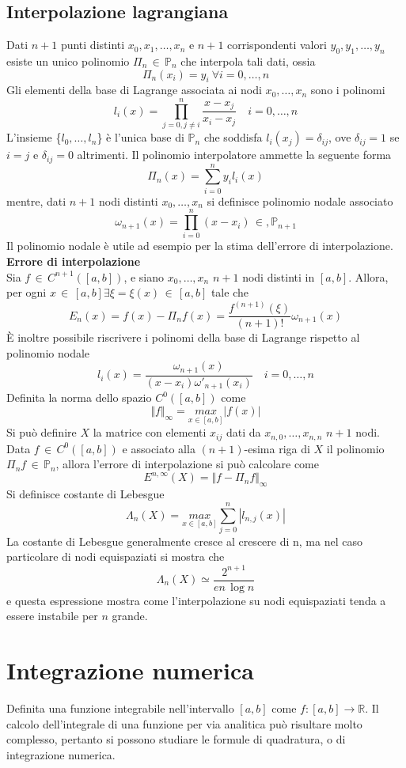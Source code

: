 \documentclass[a4paper,12pt]{article}
\begin{document}
\subsection{Interpolazione lagrangiana}
Dati $n + 1$ punti distinti $x_0 , x_1 , \ldots, x_n$ e $n + 1$  corrispondenti valori $y_0, y_1 , \ldots ,y_n$ esiste un unico polinomio $\Pi_n \, \in \, \mathbb{P}_n$ che interpola tali dati, ossia $$\Pi_n (x_i) = y_i \ \forall i = 0, \ldots,n $$
Gli elementi della base di Lagrange associata ai nodi $x_0, \ldots , x_n$ sono i polinomi
$$l_i (x) = \prod\limits_{j = 0, j\neq i}^{n} \frac{x - x_j}{x_i - x_j} \quad i= 0, \ldots , n$$
L'insieme \{$l_0, \ldots, l_n$\} è l'unica base di $\mathbb{P}_n$ che soddisfa $l_i(x_j) = \delta_{ij}$, ove $\delta_{ij} = 1$ se $ i = j$ e $\delta_{ij} = 0$ altrimenti.
Il polinomio interpolatore ammette la seguente forma 
$$
\Pi_n(x)=\sum\limits_{i=0}^ny_il_i(x)
$$
mentre, dati $n+1$ nodi distinti $x_0, \ldots, x_n$ si definisce polinomio nodale associato 
$$\omega_{n+1}(x) = \prod\limits_{i = 0}^n(x-x_i) \, \in , \mathbb{P}_{n+1}$$
Il polinomio nodale è utile ad esempio per la stima dell'errore di interpolazione. \\
\textbf{Errore di interpolazione} \\
Sia $f \, \in \, C^{n+1}([a, b])$, e siano $x_0, \ldots, x_n$ $n +1$ nodi distinti in $[a,b]$. Allora, per ogni $x \, \in \, [a,b] \exists \xi = \xi (x) \, \in \, [a,b]$ tale che
$$
E_n(x) = f(x) - \Pi_nf(x) = \frac{f^{(n+1)}(\xi)}{(n+1)!}\omega_{n+1}(x)
$$
È inoltre possibile riscrivere i polinomi della base di Lagrange rispetto al polinomio nodale
$$
l_i(x) = \frac{\omega_{n+1}(x)}{(x-x_i)\omega'_{n+1}(x_i)}\quad i= 0, \ldots, n
$$
Definita la norma dello spazio $C^0([a, b])$ come
$$
\Vert f\Vert_\infty = \underset{x \in [a,b]}{max} |f(x)|
$$
Si può definire $X$ la matrice con elementi $x_{ij}$ dati da $x_{n, 0}, \ldots, x_{n, n}$ $n + 1$ nodi. Data $f \, \in \, C^0([a, b])$ e associato alla $(n+1)$-esima riga di $X$ il polinomio $\Pi_nf \, \in \, \mathbb{P}_n$, allora l'errore di interpolazione si può calcolare come
$$
E^{n, \infty}(X) = \Vert f - \Pi_nf \Vert_\infty
$$
Si definisce costante di Lebesgue 
$$
\Lambda_n(X) = \underset{x \in [a,b]}{max} \sum\limits_{j=0}^n|l_{n,j}(x)|
$$
La costante di Lebesgue generalmente cresce al crescere di n, ma nel caso particolare di nodi equispaziati si mostra che
$$
\Lambda_n(X) \simeq \frac{2^{n+1}}{en \, \log n}
$$
e questa espressione mostra come l'interpolazione su nodi equispaziati tenda a essere instabile per $n$ grande.
\section{Integrazione numerica}
Definita una funzione integrabile nell'intervallo $[a,b]$ come $f : [a,b] \rightarrow \mathbb{R}$. Il calcolo dell'integrale di una funzione per via analitica può risultare molto complesso, pertanto si possono studiare le formule di quadratura, o di integrazione numerica.\\
\end{document}
